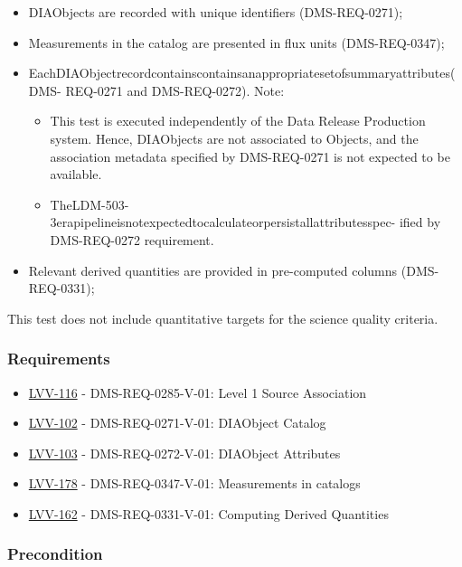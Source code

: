\begin{itemize}
\tightlist
\item
  DIAObjects are recorded with unique identifiers (DMS-REQ-0271);
\item
  Measurements in the catalog are presented in flux units
  (DMS-REQ-0347);
\item
  EachDIAObjectrecordcontainscontainsanappropriatesetofsummaryattributes(DMS-
  REQ-0271 and DMS-REQ-0272). Note:

  \begin{itemize}
  \tightlist
  \item
    This test is executed independently of the Data Release Production
    system. Hence, DIAObjects are not associated to Objects, and the
    association metadata specified by DMS-REQ-0271 is not expected to be
    available.
  \item
    TheLDM-503-3erapipelineisnotexpectedtocalculateorpersistallattributesspec-
    ified by DMS-REQ-0272 requirement.
  \end{itemize}
\item
  Relevant derived quantities are provided in pre-computed columns
  (DMS-REQ-0331);~
\end{itemize}

This test does not include quantitative targets for the science quality
criteria.

\subsubsection{Requirements}\label{requirements-5}

\begin{itemize}
\tightlist
\item
  \href{https://jira.lsstcorp.org/browse/LVV-116}{LVV-116} -
  DMS-REQ-0285-V-01: Level 1 Source Association
\item
  \href{https://jira.lsstcorp.org/browse/LVV-102}{LVV-102} -
  DMS-REQ-0271-V-01: DIAObject Catalog
\item
  \href{https://jira.lsstcorp.org/browse/LVV-103}{LVV-103} -
  DMS-REQ-0272-V-01: DIAObject Attributes
\item
  \href{https://jira.lsstcorp.org/browse/LVV-178}{LVV-178} -
  DMS-REQ-0347-V-01: Measurements in catalogs
\item
  \href{https://jira.lsstcorp.org/browse/LVV-162}{LVV-162} -
  DMS-REQ-0331-V-01: Computing Derived Quantities
\end{itemize}

\subsubsection{Precondition}\label{precondition-5}

